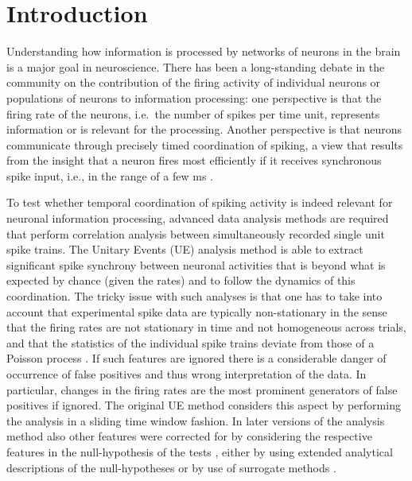 \documentclass[10pt,a4paper,onecolumn]{article}
\begin{document}
\section{Introduction}\label{introduction}

Understanding how information is processed by networks of neurons in the
brain is a major goal in neuroscience. There has been a long-standing
debate in the community on the contribution of the firing activity of
individual neurons or populations of neurons to information processing:
one perspective is that the firing rate of the neurons, i.e.~the number
of spikes per time unit, represents information or is relevant for the
processing. Another perspective is that neurons communicate through
precisely timed coordination of spiking, a view that results from the
insight that a neuron fires most efficiently if it receives synchronous
spike input, i.e., in the range of a few ms \autocite{Abeles82}.

To test whether temporal coordination of spiking activity is indeed
relevant for neuronal information processing, advanced data analysis
methods are required that perform correlation analysis between
simultaneously recorded single unit spike trains. The Unitary Events
(UE) analysis method \autocites{GruenPhD}{Gruen99}{Gruen02a}{Gruen02b}
is able to extract significant spike synchrony between neuronal
activities that is beyond what is expected by chance (given the rates)
and to follow the dynamics of this coordination. The tricky issue with
such analyses is that one has to take into account that experimental
spike data are typically non-stationary in the sense that the firing
rates are not stationary in time and not homogeneous across trials, and
that the statistics of the individual spike trains deviate from those of
a Poisson process \autocites{Gruen09}{GruenRotter10_Chap10}. If such
features are ignored there is a considerable danger of occurrence of
false positives and thus wrong interpretation of the data. In
particular, changes in the firing rates are the most prominent
generators of false positives if ignored. The original UE method
considers this aspect by performing the analysis in a sliding time
window fashion. In later versions of the analysis method also other
features were corrected for by considering the respective features in
the null-hypothesis of the tests
\autocites{Gruen03b}{Maldonado08}{Louis10}{Pipa2013}, either by using
extended analytical descriptions of the null-hypotheses or by use of
surrogate methods \autocites{Gruen09}{GruenRotter10_Chap10}{Louis10}.
\end{document}
